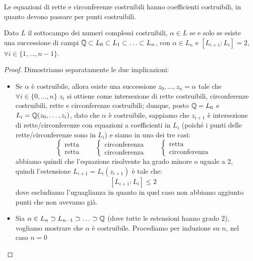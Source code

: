 \documentclass[11pt]{scrartcl}
\begin{document}
\begin{remark}
    Le equazioni di rette e circonferenze costruibili hanno coefficienti costruibili, in quanto devono passare per punti costruibili.
\end{remark}
\pagebreak
\begin{theorem}
    \label{3.76}
    Dato $L$ il sottocampo dei numeri complessi costruibili, $\alpha \in L$ se e solo se esiste una successione di campi $\mathbb Q \subset L_0 \subset L_1 \subset \ldots \subset L_n$, con $\alpha \in L_n$ e $[L_{i+1} : L_i] = 2$, $\forall i \in \{1,\ldots,n-1\}$.
\end{theorem}

\begin{proof}
    Dimostriamo separatamente le due implicazioni:
    \begin{itemize}
        \item Se $\alpha$ è costruibile, allora esiste una successione $z_0,\ldots,z_n = \alpha$ tale che $\forall i \in \{0,\ldots,n\}$ $z_i$ si ottiene come intersezione di rette costruibili, circonferenze costruibili, rette e circonferenze costruibili; dunque, posto
        $\mathbb Q = L_0$ e $L_i = \mathbb Q(z_0,\ldots,z_i)$, dato che $\alpha$ è costruibile, sappiamo che $z_{i+1}$ è intersezione di rette/circonferenze con equazioni a coefficienti in $L_i$ (poiché i punti delle rette/circonferenze sono in $L_i$) e siamo in uno dei tre casi:
        \[ \begin{cases}
            \text{retta}\\
            \text{retta}
            \end{cases}
            \qquad
            \begin{cases}
            \text{circonferenza}\\
            \text{circonferenza}
            \end{cases}
            \qquad
            \begin{cases}
            \text{retta}\\
            \text{circonferenza}
            \end{cases}
            \]
        abbiamo quindi che l'equazione risolvente ha grado minore o uguale a 2, quindi l'estensione $L_{i+1} = L_i(z_{i+1})$ è tale che:
        \[ [L_{i+1} : L_i] \leq 2
            \]
        dove escludiamo l'uguaglianza in quanto in quel caso non abbiamo aggiunto punti che non avevamo già.
        \item Sia $\alpha \in L_n \supset L_{n-1} \supset \ldots \supset \mathbb Q$ (dove tutte le estensioni hanno grado 2), vogliamo mostrare che $\alpha$ è costruibile. Procediamo per induzione su $n$, nel caso $n = 0$

\end{itemize}
\end{proof}
\end{document}
